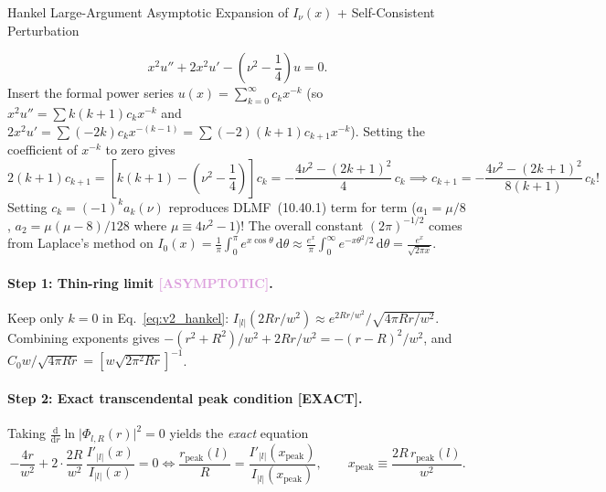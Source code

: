 \documentclass[10pt,letterpaper]{article}
\newcommand{\abs}[1]{\lvert #1 \rvert}
\newcommand{\dd}{\mathrm{d}}
\newcommand{\tagexact}{\textcolor{forest}{\textbf{[EXACT]}}}
\newcommand{\tagasymp}{\textcolor{plum}{\textbf{[ASYMPTOTIC]}}}
\numberwithin{equation}{section}
\begin{document}
\begin{approxbox}{Hankel Large-Argument Asymptotic Expansion of $I_\nu(x)$ + Self-Consistent Perturbation}
\begin{itemize}[leftmargin=1.4em,itemsep=2pt,topsep=1pt]
  \[
    x^2 u'' + 2x^2 u' - \left(\nu^2 - \frac{1}{4}\right) u = 0.
  \]
  Insert the formal power series $u(x) = \sum_{k=0}^\infty c_k x^{-k}$ (so $x^2 u'' = \sum k(k+1) c_k x^{-k}$ and $2x^2 u' = \sum (-2k) c_k x^{-(k-1)} = \sum (-2)(k+1) c_{k+1} x^{-k}$). Setting the coefficient of $x^{-k}$ to zero gives
  \[
    2(k+1) c_{k+1} = \left[k(k+1) - \left(\nu^2 - \frac{1}{4}\right)\right] c_k = -\frac{4\nu^2 - (2k+1)^2}{4}\,c_k \implies c_{k+1} = -\frac{4\nu^2 - (2k+1)^2}{8(k+1)}\,c_k!
  \]
  Setting $c_k = (-1)^k a_k(\nu)$ reproduces DLMF~(10.40.1) term for term ($a_1 = \mu/8$, $a_2 = \mu(\mu-8)/128$ where $\mu \equiv 4\nu^2 - 1$)! The overall constant $(2\pi)^{-1/2}$ comes from Laplace's method on $I_0(x) = \frac{1}{\pi}\int_0^\pi e^{x\cos\theta}\,\dd\theta \approx \frac{e^x}{\pi}\int_0^\infty e^{-x\theta^2/2}\,\dd\theta = \frac{e^x}{\sqrt{2\pi x}}$.
\end{itemize}
\end{approxbox}

\paragraph*{Step 1: Thin-ring limit \tagasymp{}.}
Keep only $k = 0$ in Eq.~\eqref{eq:v2_hankel}: $I_{\abs{l}}(2Rr/w^2) \approx e^{2Rr/w^2}/\sqrt{4\pi Rr/w^2}$. Combining exponents gives $-(r^2+R^2)/w^2 + 2Rr/w^2 = -(r-R)^2/w^2$, and $C_0 w/\sqrt{4\pi Rr} = [w\sqrt{2\pi^2 Rr}]^{-1}$.

\paragraph*{Step 2: Exact transcendental peak condition \tagexact{}.}
Taking $\frac{\dd}{\dd r}\ln\abs{\Phi_{l,R}(r)}^2 = 0$ yields the \emph{exact} equation
\begin{equation}
  -\frac{4r}{w^2} + 2\cdot\frac{2R}{w^2}\,\frac{I'_{\abs{l}}(x)}{I_{\abs{l}}(x)} = 0 \iff \frac{r_{\mathrm{peak}}(l)}{R} = \frac{I'_{\abs{l}}(x_{\mathrm{peak}})}{I_{\abs{l}}(x_{\mathrm{peak}})}, \qquad x_{\mathrm{peak}} \equiv \frac{2R\,r_{\mathrm{peak}}(l)}{w^2}.
  \label{eq:v2_exact_peak}
\end{equation}
\end{document}
